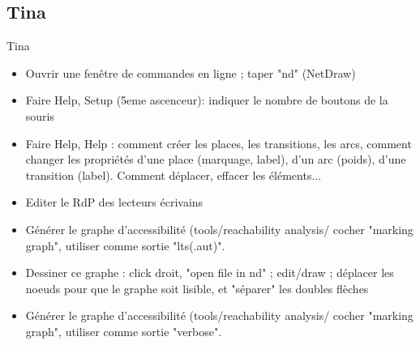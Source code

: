 \documentclass[compress]{beamer}
\begin{document}
\subsection{Tina}
\begin{frame}{Tina}
\begin{small}
\begin{itemize}
\item Ouvrir une fenêtre de commandes en ligne ; taper "nd" (NetDraw)
\item Faire Help, Setup (5eme ascenceur): indiquer le nombre de boutons de la souris
\item Faire Help, Help : comment créer les  places, les transitions, les arcs, comment changer les propriétés d'une place (marquage, label), d'un arc (poids), d'une transition (label). Comment déplacer, effacer les éléments...
\item Editer le RdP des lecteurs écrivains
\item Générer le graphe d'accessibilité (tools/reachability analysis/ cocher "marking graph", utiliser comme sortie "lts(.aut)".
\item Dessiner ce graphe : click droit, "open file in nd" ; edit/draw ; déplacer les noeuds pour que le graphe soit lisible, et "séparer" les doubles flèches
\item Générer le graphe d'accessibilité (tools/reachability analysis/ cocher "marking graph", utiliser comme sortie "verbose".
\end{itemize}
\end{small}
\end{frame}    

\end{document}
